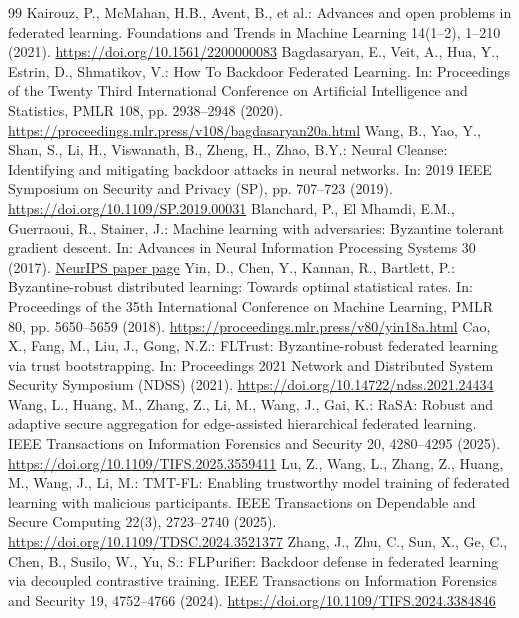 \documentclass[10pt,a4paper,UTF8,fontset=fandol]{ctexart}
\begin{document}
\begingroup
\small
\begin{thebibliography}{99}
\setlength{\itemsep}{0pt}
     Kairouz, P., McMahan, H.B., Avent, B., et al.: Advances and open problems in federated learning. Foundations and Trends in Machine Learning 14(1--2), 1--210 (2021). \url{https://doi.org/10.1561/2200000083}
     Bagdasaryan, E., Veit, A., Hua, Y., Estrin, D., Shmatikov, V.: How To Backdoor Federated Learning. In: Proceedings of the Twenty Third International Conference on Artificial Intelligence and Statistics, PMLR 108, pp. 2938--2948 (2020). \url{https://proceedings.mlr.press/v108/bagdasaryan20a.html}
     Wang, B., Yao, Y., Shan, S., Li, H., Viswanath, B., Zheng, H., Zhao, B.Y.: Neural Cleanse: Identifying and mitigating backdoor attacks in neural networks. In: 2019 IEEE Symposium on Security and Privacy (SP), pp. 707--723 (2019). \url{https://doi.org/10.1109/SP.2019.00031}
     Blanchard, P., El Mhamdi, E.M., Guerraoui, R., Stainer, J.: Machine learning with adversaries: Byzantine tolerant gradient descent. In: Advances in Neural Information Processing Systems 30 (2017). \href{https://papers.nips.cc/paper/6617-machine-learning-with-adversaries-byzantine-tolerant-gradient-descent}{NeurIPS paper page}
     Yin, D., Chen, Y., Kannan, R., Bartlett, P.: Byzantine-robust distributed learning: Towards optimal statistical rates. In: Proceedings of the 35th International Conference on Machine Learning, PMLR 80, pp. 5650--5659 (2018). \url{https://proceedings.mlr.press/v80/yin18a.html}
     Cao, X., Fang, M., Liu, J., Gong, N.Z.: FLTrust: Byzantine-robust federated learning via trust bootstrapping. In: Proceedings 2021 Network and Distributed System Security Symposium (NDSS) (2021). \url{https://doi.org/10.14722/ndss.2021.24434}
     Wang, L., Huang, M., Zhang, Z., Li, M., Wang, J., Gai, K.: RaSA: Robust and adaptive secure aggregation for edge-assisted hierarchical federated learning. IEEE Transactions on Information Forensics and Security 20, 4280--4295 (2025). \url{https://doi.org/10.1109/TIFS.2025.3559411}
     Lu, Z., Wang, L., Zhang, Z., Huang, M., Wang, J., Li, M.: TMT-FL: Enabling trustworthy model training of federated learning with malicious participants. IEEE Transactions on Dependable and Secure Computing 22(3), 2723--2740 (2025). \url{https://doi.org/10.1109/TDSC.2024.3521377}
     Zhang, J., Zhu, C., Sun, X., Ge, C., Chen, B., Susilo, W., Yu, S.: FLPurifier: Backdoor defense in federated learning via decoupled contrastive training. IEEE Transactions on Information Forensics and Security 19, 4752--4766 (2024). \url{https://doi.org/10.1109/TIFS.2024.3384846}

\end{thebibliography}
\end{document}
